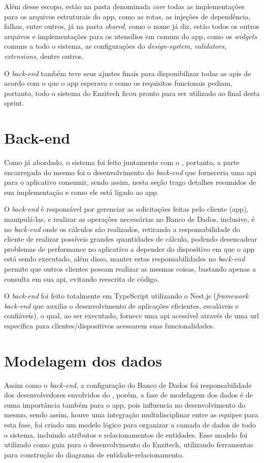 Além desse escopo, estão na pasta denominada \textit{core} todas as implementações para os arquivos estruturais do \ac{app}, como as rotas, as injeções de dependência, falhas, entre outros, já na pasta \textit{shared}, como o nome já diz, estão todos os outros arquivos e implementações para os utensílios em comum do \ac{app}, como os \textit{widgets} comuns a todo o sistema, as configurações do \textit{design-system}, \textit{validators}, \textit{extensions}, dentre outros.

O \textit{back-end} também teve seus ajustes finais para disponibilizar todas as \acp{api} de acordo com o que o app esperava e como os requisitos funcionais pediam, portanto, todo o sistema do Enzitech ficou pronto para ser utilizado ao final desta sprint.

\section{Back-end}
Como já abordado, o sistema foi feito juntamente com o , portanto, a parte encarregada do mesmo foi o desenvolvimento do \textit{back-end} que forneceria uma \ac{api} para o aplicativo consumir, sendo assim, nesta seção trago detalhes resumidos de sua implementação e como ele está ligado ao \ac{app}.

O \textit{back-end} é responsável por gerenciar as solicitações feitas pelo cliente (\ac{app}), manipulá-las, e realizar as operações necessárias no Banco de Dados, inclusive, é no \textit{back-end} onde os cálculos são realizados, retirando a responsabilidade do cliente de realizar possíveis grandes quantidades de cálculo, podendo desencadear problemas de performance no aplicativo a depender do dispositivo em que o \ac{app} está sendo executado, além disso, manter estas responsabilidades no \textit{back-end} permite que outros clientes possam realizar as mesmas coisas, bastando apenas a consulta em sua \ac{api}, evitando reescrita de código.

O \textit{back-end} foi feito totalmente em TypeScript utilizando o Nest.js (\textit{framework back-end} que auxilia o desenvolvimento de aplicações eficientes, escaláveis e confiáveis), o qual, ao ser executado, fornece uma \ac{api} acessível através de uma \ac{url} específica para clientes/dispositivos acessarem suas funcionalidades.

\section{Modelagem dos dados}
Assim como o \textit{back-end}, a configuração do Banco de Dados foi responsabilidade dos desenvolvedores envolvidos do , porém, a fase de modelagem dos dados é de suma importância também para o \ac{app}, pois influencia no desenvolvimento do mesmo, sendo assim, houve uma integração multidisciplinar entre as equipes para esta fase, foi criado um modelo lógico para organizar a camada de dados de todo o sistema, incluindo atributos e relacionamentos de entidades. Esse modelo foi utilizado como guia para o desenvolvimento do Enzitech, utilizando ferramentas para construção do diagrama de entidade-relacionamento.

